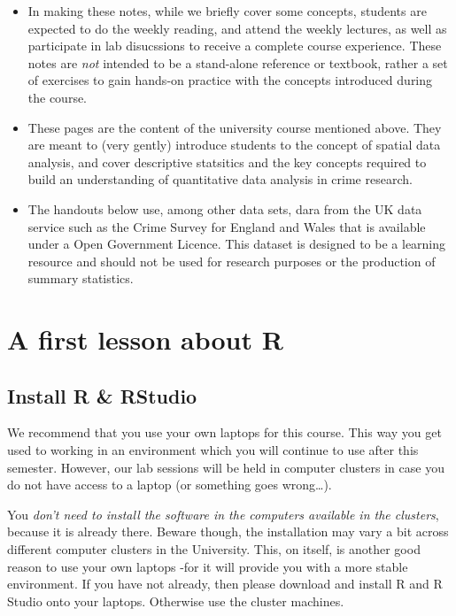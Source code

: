 \documentclass[]{book}
\providecommand{\tightlist}{%
  \setlength{\itemsep}{0pt}\setlength{\parskip}{0pt}}
\begin{document}
\begin{itemize}
\tightlist
\item
  In making these notes, while we briefly cover some concepts, students are expected to do the weekly reading, and attend the weekly lectures, as well as participate in lab disucssions to receive a complete course experience. These notes are \emph{not} intended to be a stand-alone reference or textbook, rather a set of exercises to gain hands-on practice with the concepts introduced during the course.
\item
  These pages are the content of the university course mentioned above. They are meant to (very gently) introduce students to the concept of spatial data analysis, and cover descriptive statsitics and the key concepts required to build an understanding of quantitative data analysis in crime research.
\item
  The handouts below use, among other data sets, dara from the UK data service such as the Crime Survey for England and Wales that is available under a Open Government Licence. This dataset is designed to be a learning resource and should not be used for research purposes or the production of summary statistics.
\end{itemize}

\hypertarget{a-first-lesson-about-r}{%
\chapter{A first lesson about R}\label{a-first-lesson-about-r}}

\hypertarget{install-r-rstudio}{%
\section{Install R \& RStudio}\label{install-r-rstudio}}

We recommend that you use your own laptops for this course. This way you get used to working in an environment which you will continue to use after this semester. However, our lab sessions will be held in computer clusters in case you do not have access to a laptop (or something goes wrong\ldots{}).

You \emph{don't need to install the software in the computers available in the clusters}, because it is already there. Beware though, the installation may vary a bit across different computer clusters in the University. This, on itself, is another good reason to use your own laptops -for it will provide you with a more stable environment. If you have not already, then please download and install R and R Studio onto your laptops. Otherwise use the cluster machines.
\end{document}
